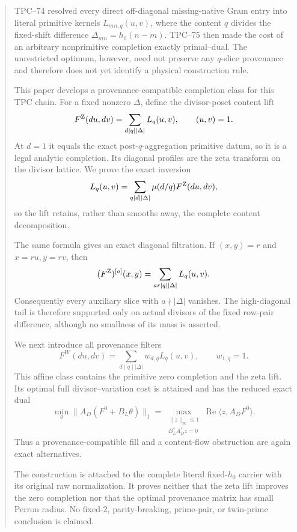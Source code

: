 \begin{abstract}
TPC--74 resolved every direct off-diagonal missing-native Gram entry into
literal primitive kernels \(L_{mn,q}(u,v)\), where the content
\(q\) divides the fixed-shift difference
\(\Delta_{mn}=h_0(n-m)\).  TPC--75 then made the cost of an arbitrary
nonprimitive completion exactly primal--dual.  The unrestricted optimum,
however, need not preserve any \(q\)-slice provenance and therefore does
not yet identify a physical construction rule.

This paper develops a provenance-compatible completion class for this
TPC chain.
For a fixed nonzero \(\Delta\), define the divisor-poset content lift
\[
 F^{\rm Z}(du,dv)
 =
 \sum_{d\mid q\mid|\Delta|}L_q(u,v),
 \qquad (u,v)=1.
\]
At \(d=1\) it equals the exact post-\(q\)-aggregation primitive datum, so
it is a legal analytic completion.  Its diagonal profiles are the zeta
transform on the divisor lattice.  We prove the exact inversion
\[
 L_q(u,v)
 =
 \sum_{q\mid d\mid|\Delta|}
 \mu(d/q)F^{\rm Z}(du,dv),
\]
so the lift retains, rather than smooths away, the complete content
decomposition.

The same formula gives an exact diagonal filtration.  If
\((x,y)=r\) and \(x=ru,y=rv\), then
\[
 (F^{\rm Z})^{[a]}(x,y)
 =
 \sum_{ar\mid q\mid|\Delta|}L_q(u,v).
\]
Consequently every auxiliary slice with \(a\nmid|\Delta|\) vanishes.
The high-diagonal tail is therefore supported only on actual divisors of
the fixed row-pair difference, although no smallness of its mass is
asserted.

We next introduce all provenance filters
\[
 F^W(du,dv)
 =
 \sum_{d\mid q\mid|\Delta|}w_{d,q}L_q(u,v),
 \qquad w_{1,q}=1.
\]
This affine class contains the primitive zero completion and the zeta
lift.  Its optimal full divisor--variation cost is attained and has the
reduced exact dual
\[
 \min_\theta\|A_D(F^0+B_L\theta)\|_1
 =
 \max_{\substack{\|z\|_\infty\le1\\B_L^*A_D^*z=0}}
 \operatorname{Re}\langle z,A_DF^0\rangle.
\]
Thus a provenance-compatible fill and a content-flow obstruction are
again exact alternatives.

The construction is attached to the complete literal fixed-\(h_0\)
carrier with its original raw normalization.  It proves neither that the
zeta lift improves the zero completion nor that the optimal provenance
matrix has small Perron radius.  No fixed-\(2\), parity-breaking,
prime-pair, or twin-prime conclusion is claimed.
\end{abstract}

